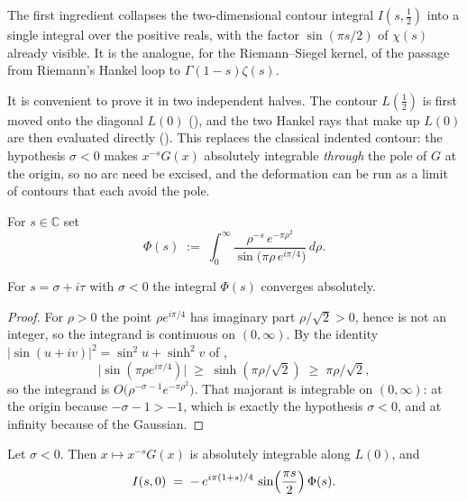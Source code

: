 The first ingredient collapses the two-dimensional contour integral $I(s,\tfrac12)$ into a
single integral over the positive reals, with the factor $\sin(\pi s/2)$ of $\chi(s)$
already visible.  It is the analogue, for the Riemann--Siegel kernel, of the passage from
Riemann's Hankel loop to $\Gamma(1-s)\zeta(s)$.

It is convenient to prove it in two independent halves.  The contour $L(\tfrac12)$ is first
moved onto the diagonal $L(0)$ (), and the two Hankel rays that make up
$L(0)$ are then evaluated directly ().  This replaces the classical
indented contour: the hypothesis $\sigma<0$ makes $x^{-s}G(x)$ absolutely integrable
\emph{through} the pole of $G$ at the origin, so no arc need be excised, and the deformation
can be run as a limit of contours that each avoid the pole.

\begin{definition}
\label{def:rsz_phi}
\leanok
For $s\in\mathbb{C}$ set
\[
  \Phi(s)\;:=\;\int_{0}^{\infty}\frac{\rho^{-s}\,e^{-\pi\rho^{2}}}
       {\sin\bigl(\pi\rho\,e^{i\pi/4}\bigr)}\,d\rho .
\]
\end{definition}

\begin{lemma}
\label{lem:rsz_phi_conv}
\leanok
{}
For $s=\sigma+i\tau$ with $\sigma<0$ the integral $\Phi(s)$ converges absolutely.
\end{lemma}

\begin{proof}
\leanok
For $\rho>0$ the point $\rho e^{i\pi/4}$ has imaginary part $\rho/\sqrt2>0$, hence is not an
integer, so the integrand is continuous on $(0,\infty)$.  By the identity
$\lvert\sin(u+iv)\rvert^{2}=\sin^{2}u+\sinh^{2}v$ of ,
\[
  \bigl\lvert\sin(\pi\rho e^{i\pi/4})\bigr\rvert\;\ge\;\sinh(\pi\rho/\sqrt2)\;\ge\;\pi\rho/\sqrt2 ,
\]
so the integrand is $O\bigl(\rho^{-\sigma-1}e^{-\pi\rho^{2}}\bigr)$.  That majorant is
integrable on $(0,\infty)$: at the origin because $-\sigma-1>-1$, which is exactly the
hypothesis $\sigma<0$, and at infinity because of the Gaussian.
\end{proof}

\begin{lemma}
\label{lem:rsz_rays}
\leanok
{}
Let $\sigma<0$.  Then $x\mapsto x^{-s}G(x)$ is absolutely integrable along $L(0)$, and
\[
  I(s,0)\;=\;-\,e^{i\pi(1+s)/4}\,\sin\Bigl(\frac{\pi s}{2}\Bigr)\,\Phi(s).
\]
\end{lemma}

